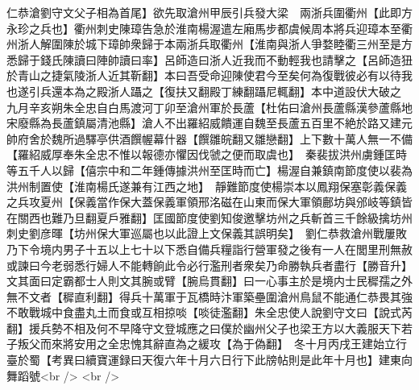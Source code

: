 仁恭滄劉守文父子相為首尾】欲先取滄州甲辰引兵發大梁　兩浙兵圍衢州【此即方永珍之兵也】衢州刺史陳璋告急於淮南楊渥遣左廂馬步都虞候周本將兵迎璋本至衢州浙人解圍陳於城下璋帥衆歸于本兩浙兵取衢州【淮南與浙人爭婺睦衢三州至是方悉歸于錢氏陳讀曰陣帥讀曰率】呂師造曰浙人近我而不動輕我也請擊之【呂師造狃於青山之捷氣陵浙人近其靳翻】本曰吾受命迎陳使君今至矣何為復戰彼必有以待我也遂引兵還本為之殿浙人躡之【復扶又翻殿丁練翻躡尼輒翻】本中道設伏大破之　九月辛亥朔朱全忠自白馬渡河丁卯至滄州軍於長蘆【杜佑曰滄州長蘆縣漢參蘆縣地宋廢縣為長蘆鎮屬清池縣】滄人不出羅紹威饋運自魏至長蘆五百里不絶於路又建元帥府舍於魏所過驛亭供酒饌幄幕什器【饌雛皖翻又雛戀翻】上下數十萬人無一不備【羅紹威厚奉朱全忠不惟以報德亦懼因伐虢之便而取虞也】　秦裴拔洪州虜鍾匡時等五千人以歸【僖宗中和二年鍾傳據洪州至匡時而亡】楊渥自兼鎮南節度使以裴為洪州制置使【淮南楊氏遂兼有江西之地】　靜難節度使楊崇本以鳳翔保塞彰義保義之兵攻夏州【保義當作保大蓋保義軍領邢洺磁在山東而保大軍領鄜坊與邠岐等鎮皆在關西也難乃旦翻夏戶雅翻】匡國節度使劉知俊邀擊坊州之兵斬首三千餘級擒坊州刺史劉彦暉【坊州保大軍巡屬也以此證上文保義其誤明矣】　劉仁恭救滄州戰屢敗乃下令境内男子十五以上七十以下悉自備兵糧詣行營軍發之後有一人在閭里刑無赦或諫曰今老弱悉行婦人不能轉餉此令必行濫刑者衆矣乃命勝執兵者盡行【勝音升】文其面曰定霸都士人則文其腕或臂【腕烏貫翻】曰一心事主於是境内士民穉孺之外無不文者【穉直利翻】得兵十萬軍于瓦橋時汴軍築壘圍滄州鳥鼠不能通仁恭畏其強不敢戰城中食盡丸土而食或互相掠啖【啖徒濫翻】朱全忠使人說劉守文曰【說式芮翻】援兵勢不相及何不早降守文登城應之曰僕於幽州父子也梁王方以大義服天下若子叛父而來將安用之全忠愧其辭直為之緩攻【為于偽翻】　冬十月丙戌王建始立行臺於蜀【考異曰續寶運録曰天復六年十月六日行下此牓帖則是此年十月也】建東向舞蹈號<br />
<br />
